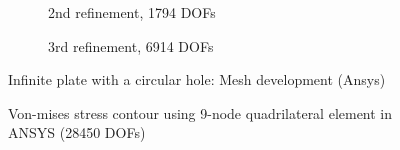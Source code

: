 \begin{figure}[h!]
\begin{subfigure}[b]{0.48\linewidth}
{        }
        \caption{2nd refinement, 1794 DOFs}
    \end{subfigure}
    \begin{subfigure}[b]{0.48\linewidth}
        \centering
        \caption{3rd refinement, 6914 DOFs}
    \end{subfigure}
    \caption{Infinite plate with a circular hole: Mesh development (Ansys)}
    \label{adap_fig:ex_chole_mesh_ansys}
\end{figure}

\begin{figure}
    \centering
    \caption[Von-mises stress contour using 9-node quadrilateral element in ANSYS]{Von-mises stress contour using 9-node quadrilateral element in ANSYS (28450 DOFs)}
    \label{adap_fig:ex_chole_stress_ansys}
\end{figure}
